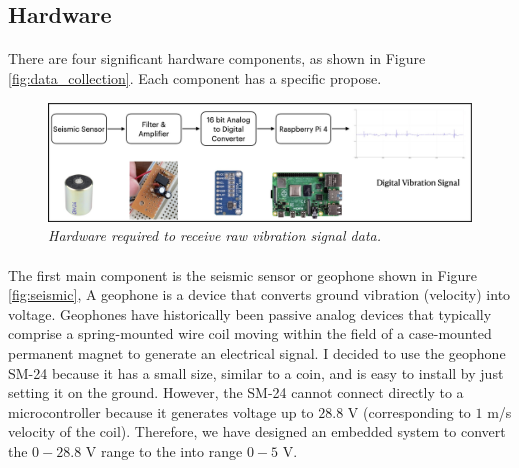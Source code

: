 \subsection{Hardware}
\paragraph{}
There are four significant hardware components, as shown in Figure \ref{fig:data_collection}. Each component has a specific propose.
    
 \begin{figure}[h]
  \centering
  \caption[Hardware required to receive raw vibration signal data.]{\emph{Hardware required to receive raw vibration signal data. \\}}\label{fig:hardware}
  \includegraphics[scale = 0.2]{figures/hardware.jpg}  
\end{figure}

\paragraph{}
The first main component is the seismic sensor or geophone shown in Figure \ref{fig:seismic}, A geophone is a device that converts ground vibration (velocity) into voltage. Geophones have historically been passive analog devices that typically comprise a spring-mounted wire coil moving within the field of a case-mounted permanent magnet to generate an electrical signal. I decided to use the geophone SM-24 because it has a small size, similar to a coin, and is easy to install by just setting it on the ground. However, the SM-24 cannot connect directly to a microcontroller because it generates voltage up to $28.8$ V (corresponding to $1$ m/s velocity of the coil). Therefore, we have designed an embedded system to convert the $0 - 28.8$ V range to the into range $0 - 5$ V.

